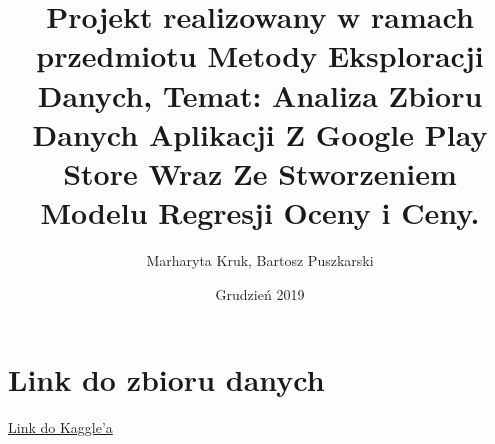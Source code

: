 \documentclass[12pt, a4paper]{article}
\title{Projekt realizowany w ramach przedmiotu Metody Eksploracji Danych, Temat: Analiza Zbioru Danych Aplikacji Z Google Play Store Wraz Ze Stworzeniem Modelu Regresji Oceny i Ceny.}
\author{Marharyta Kruk, Bartosz Puszkarski}
\date{Grudzień 2019}
\begin{document}
\maketitle
\thispagestyle{firstPageStyle}
\newpage
\tableofcontents

\newpage
\section{Link do zbioru danych}
\href{https://www.kaggle.com/lava18/google-play-store-apps?fbclid=IwAR2PyzHNAo0x_v-nGmEWigN9ieh4juCYgEIsH7zt7evD9MtlRz6MXVcUjiQ}{Link do Kaggle'a}
\end{document}
